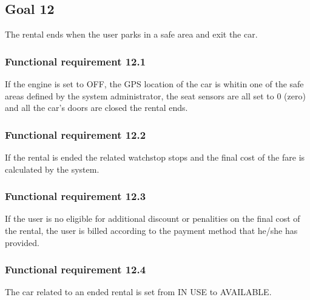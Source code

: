 \subsection{Goal 12}
The rental ends when the user parks in a safe area and exit the car.

\setcounter{secnumdepth}{3}
\subsubsection{Functional requirement 12.1}
If the engine is set to OFF, the GPS location of the car is whitin one of the safe areas defined by the system administrator, the seat sensors are all set to 0 (zero) and all the car's doors are closed the rental ends.

\subsubsection{Functional requirement 12.2}
If the rental is ended the related watchstop stops and the final cost of the fare is calculated by the system.

\subsubsection{Functional requirement 12.3}
If the user is no eligible for additional discount or penalities on the final cost of the rental, the user is billed according to the payment method that he/she has provided.

\subsubsection{Functional requirement 12.4}
The car related to an ended rental is set from IN USE to AVAILABLE.
